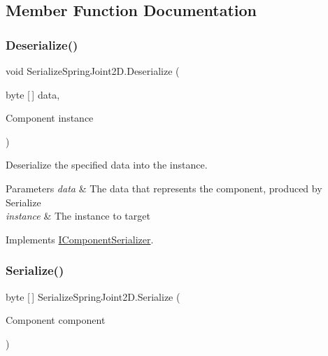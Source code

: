\subsection{Member Function Documentation}
\mbox{\label{class_serialize_spring_joint2_d_aac148dbf74d0b00fff9983e677ed4a10}} 
\subsubsection{\texorpdfstring{Deserialize()}{Deserialize()}}
{\footnotesize\ttfamily void Serialize\+Spring\+Joint2\+D.\+Deserialize (\begin{DoxyParamCaption}\item[{byte \mbox{[}$\,$\mbox{]}}]{data,  }\item[{Component}]{instance }\end{DoxyParamCaption})\hspace{0.3cm}{\ttfamily [inline]}}



Deserialize the specified data into the instance. 


\begin{DoxyParams}{Parameters}
{\em data} & The data that represents the component, produced by Serialize \\
\hline
{\em instance} & The instance to target \\
\hline
\end{DoxyParams}


Implements \hyperlink{interface_i_component_serializer_a4cc366a5c78b33d47a90c209d8fed883}{I\+Component\+Serializer}.

\mbox{\label{class_serialize_spring_joint2_d_a74dc25a62ade31ed51b3f47d1097e5e7}} 
\subsubsection{\texorpdfstring{Serialize()}{Serialize()}}
{\footnotesize\ttfamily byte \mbox{[}$\,$\mbox{]} Serialize\+Spring\+Joint2\+D.\+Serialize (\begin{DoxyParamCaption}\item[{Component}]{component }\end{DoxyParamCaption})\hspace{0.3cm}{\ttfamily [inline]}}




